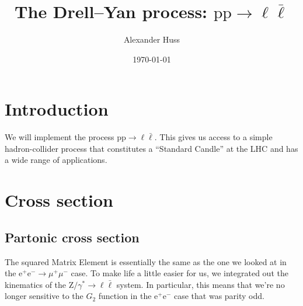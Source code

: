 \documentclass[11pt]{article}
\author{Alexander Huss}
\date{\today}
\title{The Drell--Yan process: \(\mathrm{p}\mathrm{p} \to \ell\bar{\ell}\)}
\begin{document}
\maketitle
\tableofcontents



\section{Introduction}
\label{sec:org5c52293}
We will implement the process \(\mathrm{p}\mathrm{p} \to \ell\bar{\ell}\).
This gives us access to a simple hadron-collider process that constitutes a ``Standard Candle'' at the LHC and has a wide range of applications.

\section{Cross section}
\label{sec:orgd2aa8de}

\subsection{Partonic cross section}
\label{sec:orge732d29}

The squared Matrix Element is essentially the same as the one we looked at in the \(\mathrm{e}^+\mathrm{e}^- \to \mu^+ \mu^-\) case.
To make life a little easier for us, we integrated out the kinematics of the \(\mathrm{Z}/\gamma^*\to\ell\bar{\ell}\) system.
In particular, this means that we're no longer sensitive to the \(G_2\) function in the \(\mathrm{e}^+\mathrm{e}^-\) case that was parity odd.
\end{document}
